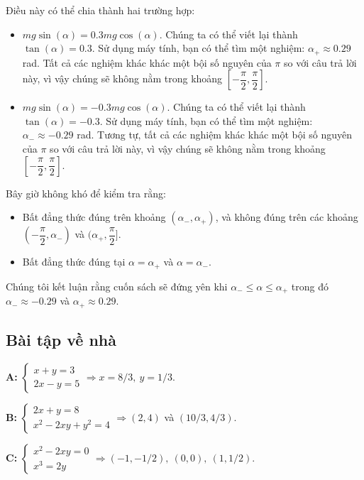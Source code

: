 \documentclass[12pt,a4paper]{article}
\begin{document}
Điều này có thể chia thành hai trường hợp:

\begin{itemize}
    \item \(mg\sin (\alpha )=0.3mg\cos (\alpha )\). Chúng ta có thể viết lại thành \(\tan (\alpha )=0.3\). Sử dụng máy tính, bạn có thể tìm một nghiệm: \(\alpha _{+}\approx 0.29\) rad. Tất cả các nghiệm khác khác một bội số nguyên của \(\pi \) so với câu trả lời này, vì vậy chúng sẽ không nằm trong khoảng \([-\dfrac{\pi }{2},\dfrac{\pi }{2}]\).
    \item \(mg\sin (\alpha )=-0.3mg\cos (\alpha )\). Chúng ta có thể viết lại thành \(\tan (\alpha )=-0.3\). Sử dụng máy tính, bạn có thể tìm một nghiệm: \(\alpha _{-}\approx -0.29\) rad. Tương tự, tất cả các nghiệm khác khác một bội số nguyên của \(\pi \) so với câu trả lời này, vì vậy chúng sẽ không nằm trong khoảng \([-\dfrac{\pi }{2},\dfrac{\pi }{2}]\).
\end{itemize}

Bây giờ không khó để kiểm tra rằng:

\begin{itemize}
    \item Bất đẳng thức đúng trên khoảng \((\alpha _{-},\alpha _{+})\), và không đúng trên các khoảng \((-\dfrac{\pi }{2},\alpha _{-})\) và \((\alpha _{+},\dfrac{\pi }{2}]\).
    \item Bất đẳng thức đúng tại \(\alpha =\alpha _{+}\) và \(\alpha =\alpha _{-}\).
\end{itemize}

Chúng tôi kết luận rằng cuốn sách sẽ đứng yên khi \(\alpha _{-}\le \alpha \le \alpha _{+}\) trong đó \(\alpha _{-}\approx -0.29\) và \(\alpha _{+}\approx 0.29\).

\subsection{Bài tập về nhà}

\textbf{A:} $\begin{cases} x+y=3 \\ 2x-y=5 \end{cases} \Rightarrow x = 8/3,\ y = 1/3$.

\textbf{B:} $\begin{cases} 2x+y=8 \\ x^2-2xy+y^2=4 \end{cases} \Rightarrow (2,4)$ và $(10/3, 4/3)$.

\textbf{C:} $\begin{cases} x^2-2xy=0 \\ x^3=2y \end{cases} \Rightarrow (-1,-1/2),\ (0,0),\ (1,1/2)$.
\end{document}
